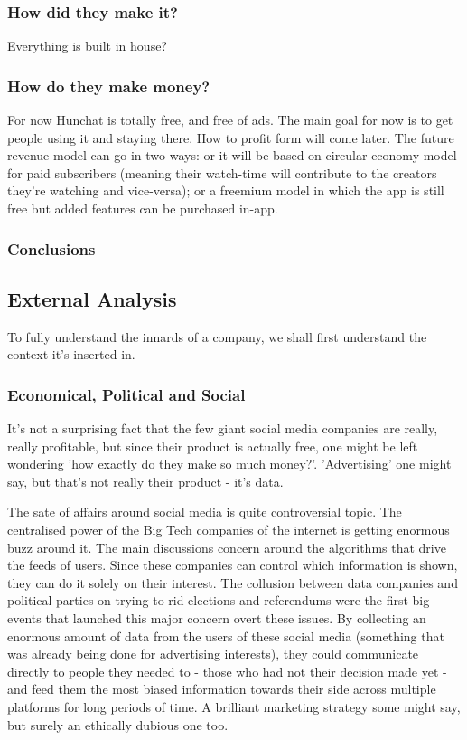 \documentclass[12pt]{article}
\begin{document}
	\subsubsection{How did they make it?}
Everything is built in house?

	\subsubsection{How do they make money?}
For now Hunchat is totally free, and free of ads. The main goal for now is to get people using it and staying there. How to profit form will come later. The future revenue model can go in two ways: or it will be based on circular economy model for paid subscribers (meaning their watch-time will contribute to the creators they're watching and vice-versa); or a freemium model in which the app is still free but added features can be purchased in-app.

	\subsubsection{Conclusions}

\subsection{External Analysis}

To fully understand the innards of a company, we shall first understand the context it's inserted in.
	
	\subsubsection{Economical, Political and Social}
	
	It's not a surprising fact that the few giant social media companies are really, really profitable, but since their product is actually free, one might be left wondering 'how exactly do they make so much money?'. 'Advertising' one might say, but that's not really their product - it's data.
	
	The sate of affairs around social media is quite controversial topic. The centralised power of the Big Tech companies of the internet is getting enormous buzz around it. The main discussions concern around the algorithms that drive the feeds of users. Since these companies can control which information is shown, they can do it solely on their interest. The collusion between data companies and political parties on trying to rid elections and referendums were the first big events that launched this major concern overt these issues. By collecting an enormous amount of data from the users of these social media (something that was already being done for advertising interests), they could communicate directly to people they needed to - those who had not their decision made yet - and feed them the most biased information towards their side across multiple platforms for long periods of time. A brilliant marketing strategy some might say, but surely an ethically dubious one too.
	
\end{document}
